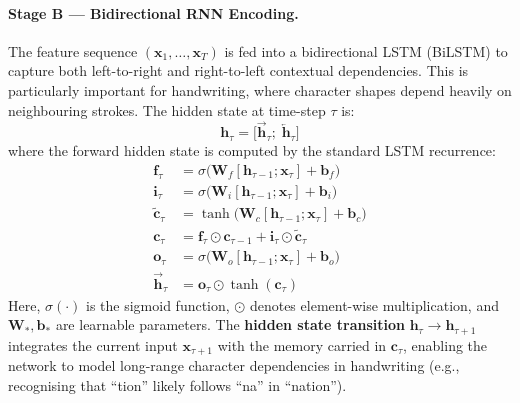 \documentclass[11pt, a4paper]{article}
\begin{document}
\paragraph{Stage B — Bidirectional RNN Encoding.}
The feature sequence $(\mathbf{x}_1, \ldots, \mathbf{x}_T)$ is fed into a bidirectional LSTM (BiLSTM) to capture both left-to-right and right-to-left contextual dependencies. This is particularly important for handwriting, where character shapes depend heavily on neighbouring strokes. The hidden state at time-step $\tau$ is:
\begin{equation}\label{eq:bilstm}
  \mathbf{h}_\tau = \bigl[\overrightarrow{\mathbf{h}}_\tau;\; \overleftarrow{\mathbf{h}}_\tau\bigr]
\end{equation}
where the forward hidden state is computed by the standard LSTM recurrence:
\begin{align}
  \mathbf{f}_\tau &= \sigma\bigl(\mathbf{W}_f [\mathbf{h}_{\tau-1}; \mathbf{x}_\tau] + \mathbf{b}_f\bigr) \label{eq:forget_gate}\\
  \mathbf{i}_\tau &= \sigma\bigl(\mathbf{W}_i [\mathbf{h}_{\tau-1}; \mathbf{x}_\tau] + \mathbf{b}_i\bigr) \label{eq:input_gate}\\
  \tilde{\mathbf{c}}_\tau &= \tanh\bigl(\mathbf{W}_c [\mathbf{h}_{\tau-1}; \mathbf{x}_\tau] + \mathbf{b}_c\bigr) \label{eq:cell_candidate}\\
  \mathbf{c}_\tau &= \mathbf{f}_\tau \odot \mathbf{c}_{\tau-1} + \mathbf{i}_\tau \odot \tilde{\mathbf{c}}_\tau \label{eq:cell_state}\\
  \mathbf{o}_\tau &= \sigma\bigl(\mathbf{W}_o [\mathbf{h}_{\tau-1}; \mathbf{x}_\tau] + \mathbf{b}_o\bigr) \label{eq:output_gate}\\
  \overrightarrow{\mathbf{h}}_{\tau} &= \mathbf{o}_\tau \odot \tanh(\mathbf{c}_\tau) \label{eq:hidden_state}
\end{align}
Here, $\sigma(\cdot)$ is the sigmoid function, $\odot$ denotes element-wise multiplication, and $\mathbf{W}_*, \mathbf{b}_*$ are learnable parameters. The \textbf{hidden state transition} $\mathbf{h}_{\tau} \to \mathbf{h}_{\tau+1}$ integrates the current input $\mathbf{x}_{\tau+1}$ with the memory carried in $\mathbf{c}_\tau$, enabling the network to model long-range character dependencies in handwriting (e.g., recognising that ``tion'' likely follows ``na'' in ``nation'').
\end{document}
